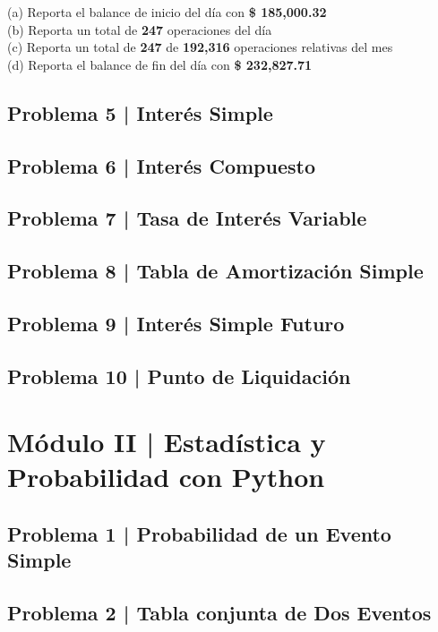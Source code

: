 \documentclass{article}
\begin{document}
\noindent
(a) Reporta el balance de inicio del día con \textbf{\$ 185,000.32}
\\[6pt]
(b) Reporta un total de \textbf{247} operaciones del día
\\[6pt]
(c) Reporta un total de \textbf{247} de \textbf{192,316} operaciones relativas del mes
\\[6pt]
(d) Reporta el balance de fin del día con \textbf{\$ 232,827.71}
\\[6pt]

\subsection*{Problema 5 | Interés Simple}

\subsection*{Problema 6 | Interés Compuesto}

\subsection*{Problema 7 | Tasa de Interés Variable}

\subsection*{Problema 8 | Tabla de Amortización Simple}

\subsection*{Problema 9 | Interés Simple Futuro}

\subsection*{Problema 10 | Punto de Liquidación}

\clearpage

\section*{Módulo II | Estadística y Probabilidad con Python}

\subsection*{Problema 1 | Probabilidad de un Evento Simple}

\subsection*{Problema 2 | Tabla conjunta de Dos Eventos}
\end{document}
